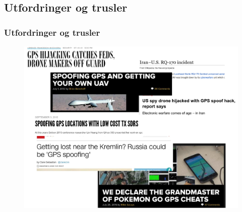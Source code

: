 \documentclass[xcolor=table]{beamer}
\begin{document}
\subsection{Utfordringer og trusler}
\begin{frame}
\frametitle{Utfordringer og trusler}
      \begin{figure}
        \includegraphics[scale=0.15]{thesis/graphics/montage.pdf}
      \end{figure}
\end{frame}
\end{document}

